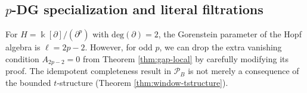 \documentclass[11pt]{article}
\theoremstyle{definition}
\newtheorem{cor}[thm]{Corollary}
\numberwithin{equation}{section}
\newcommand{\kk}{\Bbbk}
\newcommand{\Pun}{\mathcal{P}_B}
\newcommand{\Tcat}{\mathcal{P}(A,H)}
\newcommand{\Dc}{\mathcal{D}^c(A,H)}
\newcommand{\K}{\operatorname{K}_0}
\newcommand{\Der}{\mathcal{D}}
\begin{document}
\subsection{\texorpdfstring{$p$}{p}-DG specialization and literal filtrations}
\label{sec:gap-pdg-weaker}
For $H=\kk[\partial]/(\partial^p)$ with $\mathrm{deg}(\partial)=2$, the Gorenstein parameter of the Hopf algebra is
$\ell=2p-2$. 
However, for odd $p$, we can drop the extra vanishing condition $A_{2p-2}=0$ from Theorem \ref{thm:gap-local} by carefully modifying its proof.  The idempotent completeness result in $\Pun$ is not merely a consequence of the bounded $t$-structure (Theorem \ref{thm:window-tstructure}).




\end{document}
